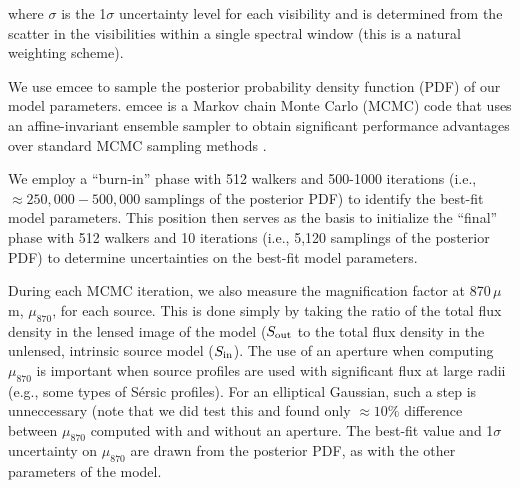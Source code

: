 \documentclass[iop]{emulateapj}
\begin{document}


\noindent where $\sigma$ is the 1$\sigma$ uncertainty level for each
visibility and is determined from the scatter in the visibilities within a
single spectral window (this is a natural weighting scheme).  

We use {\sc emcee} \citep{Foreman-Mackey:2013yq} to sample the posterior
probability density function (PDF) of our model parameters.  {\sc emcee} is a
Markov chain Monte Carlo (MCMC) code that uses an affine-invariant ensemble
sampler to obtain significant performance advantages over standard MCMC
sampling methods \citep{goodmanweare}.  

We employ a ``burn-in'' phase with 512 walkers and 500-1000 iterations (i.e.,
$\approx 250,000-500,000$ samplings of the posterior PDF) to identify the
best-fit model parameters.  This position then serves as the basis to
initialize the ``final'' phase with 512 walkers and 10 iterations (i.e., 5,120
samplings of the posterior PDF) to determine uncertainties on the best-fit
model parameters.  

During each MCMC iteration, we also measure the magnification factor at
870$\,\mu$m, $\mu_{870}$, for each source.  This is done simply by taking the
ratio of the total flux density in the lensed image of the model ($S_{\rm out}$
to the total flux density in the unlensed, intrinsic source model ($S_{\rm
in}$).  The use of an aperture when computing $\mu_{870}$ is important when
source profiles are used with significant flux at large radii (e.g., some types
of S\'ersic profiles).  For an elliptical Gaussian, such a step is unneccessary
(note that we did test this and found only $\approx 10\%$ difference between
$\mu_{870}$ computed with and without an aperture.  The best-fit value and
1$\sigma$ uncertainty on $\mu_{870}$ are drawn from the posterior PDF, as with
the other parameters of the model.
\end{document}
